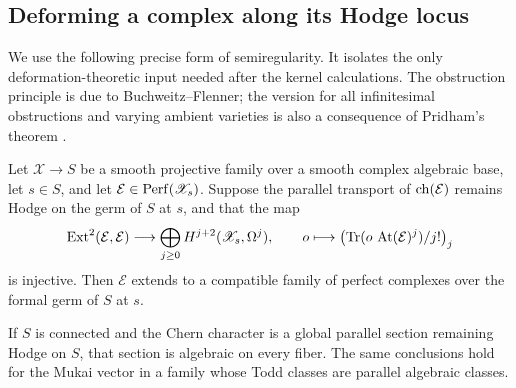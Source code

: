 \subsection{Deforming a complex along its Hodge locus}

We use the following precise form of semiregularity.  It isolates the
only deformation-theoretic input needed after the kernel calculations.
The obstruction principle is due to Buchweitz--Flenner; the version
for all infinitesimal obstructions and varying ambient varieties is
also a consequence of Pridham's theorem
\cite{BuchweitzFlennerSemiregularity,PridhamSemiregularity}.

\begin{proposition}\label{prop:semiregularity}
Let \(\mathscr X\to S\) be a smooth projective family over a smooth
complex algebraic base, let \(s\in S\), and let
\(\mathcal E\in\operatorname{Perf}(\mathscr X_s)\).  Suppose the parallel transport
of \(\operatorname{ch}(\mathcal E)\) remains Hodge on the germ of \(S\) at \(s\),
and that the map
\[
 \operatorname{Ext}^2(\mathcal E,\mathcal E)
 \longrightarrow\bigoplus_{j\ge0}H^{j+2}(\mathscr X_s,\Omega^j),
 \qquad o\longmapsto
  \bigl(\operatorname{Tr}(o\,\operatorname{At}(\mathcal E)^j)/j!\bigr)_j
\]
is injective.  Then \(\mathcal E\) extends to a compatible family of
perfect complexes over the formal germ of \(S\) at \(s\).

If \(S\) is connected and the Chern character is a global parallel
section remaining Hodge on \(S\), that section is algebraic on every
fiber.  The same conclusions hold for the Mukai vector in a family
whose Todd classes are parallel algebraic classes.
\end{proposition}

